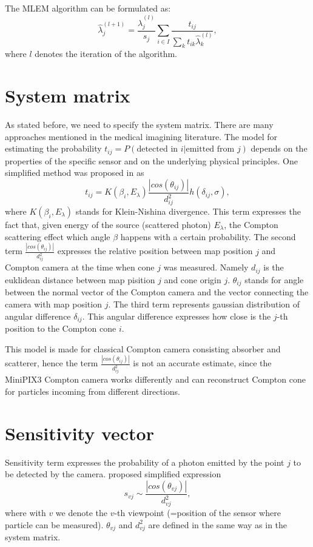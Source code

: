 The \ac{MLEM} algorithm can be formulated as:
\begin{equation}
\hat{\lambda}_{j}^{(l+1)} = \frac{\hat{\lambda}_{j}^{(l)}}{s_{j}} \sum_{i \in I} \frac{t_{ij}}{\sum_{k} t_{ik} \hat{\lambda}_{k}^{(l)}},
  \label{eq:MLEM}
\end{equation}
where $l$ denotes the iteration of the algorithm.

\section{System matrix}
As stated before, we need to specify the system matrix.
There are many approaches mentioned in the medical imagining literature.
The model for estimating the probability $t_{ij} = P(\textrm{detected in } i | \textrm{emitted from } j)$ depends on the properties of the specific sensor and on the underlying physical principles.
One simplified method was proposed in \cite{maxim2016} as
\begin{equation}
  t_{ij} = K(\beta_{i},E_{\lambda})   \frac{\left| cos(\theta_{ij}) \right|}{d^{2}_{ij}} h(\delta_{ij}, \sigma),
\end{equation}
where $K(\beta_{i},E_{\lambda})$ stands for Klein-Nishina divergence. 
This term expresses the fact that, given energy of the source (scattered photon) $E_{\lambda}$, the Compton scattering effect which angle $\beta$ happens with a certain probability. 
The second term  $\frac{\left| cos(\theta_{ij}) \right|}{d^{2}_{ij}}$ expresses the relative position between map position $j$ and Compton camera at the time when cone $j$ was measured.
Namely $d_{ij}$ is the euklidean distance between map pisition $j$ and cone origin $j$.
$\theta_{ij}$ stands for angle between the normal vector of the Compton camera and the vector connecting the camera with map position $j$. 
The third term represents gaussian distribution of angular difference $\delta_{ij}$. 
This angular difference expresses how close is the $j$-th position to the Compton cone $i$.

This model is made for classical Compton camera consisting absorber and scatterer, hence the term $\frac{\left| cos(\theta_{ij}) \right|}{d^{2}_{ij}}$ is not an accurate estimate, since the MiniPIX3 Compton camera works differently and can reconstruct Compton cone for particles incoming from different directions.

\section{Sensitivity vector}
Sensitivity term expresses the probability of a photon emitted by the point $j$ to be detected by the camera. 
\cite{maxim2016} proposed simplified expression
\begin{equation}
  s_{vj} \sim \frac{\left| cos(\theta_{vj}) \right|}{d^{2}_{vj}},
\end{equation}
where with $v$ we denote the $v$-th viewpoint (=position of the sensor where particle can be measured). $\theta_{vj}$ and $d^{2}_{vj}$ are defined in the same way as in the system matrix.

